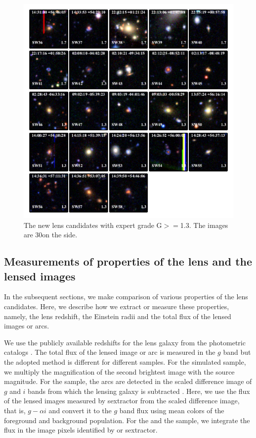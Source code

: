 \documentclass[useAMS,usenatbib,a4paper]{mn2e}
\begin{document}
\begin{figure}
\begin{center}
\includegraphics[scale=1.9]{sw-cfhtls-figs/lenscandfin_1.pdf}
\caption{ \label{fig:lc}
The new \sw lens candidates with expert grade G$>=$1.3. The images are
30\arcsec on the side.
}
\end{center}
\end{figure}

\subsection{Measurements of properties of the lens and the lensed images}
\label{sec:results:meas}

In the subsequent sections, we make comparison of various properties of the lens
candidates. Here, we describe how we extract or measure these properties, namely,
the lens redshift, the Einstein radii and the total flux of the lensed images or
arcs.

We use the publicly available redshifts for the lens galaxy from the
\cfhtls photometric catalogs \citep{Coupon2009}. The total flux of the
lensed image or arc is measured in the $g$ band but the adopted method
is different for different samples. For the simulated sample, we
multiply the magnification of the second brightest image with the source
magnitude. For the \rf sample, the arcs are detected in the scaled
difference image of $g$ and $i$ bands from which the lensing galaxy is
subtracted \citep[for details, see][]{Gavazzi2014}. Here, we use the flux
of the lensed images measured by {\sc sextractor} from the scaled
difference image, that is, $g-\alpha i$ and convert it to the $g$ band
flux using mean colors of the foreground and background population. For
the \af and the \sw sample, we integrate the flux in the image pixels
identified by \af or {\sc sextractor}.
\end{document}
